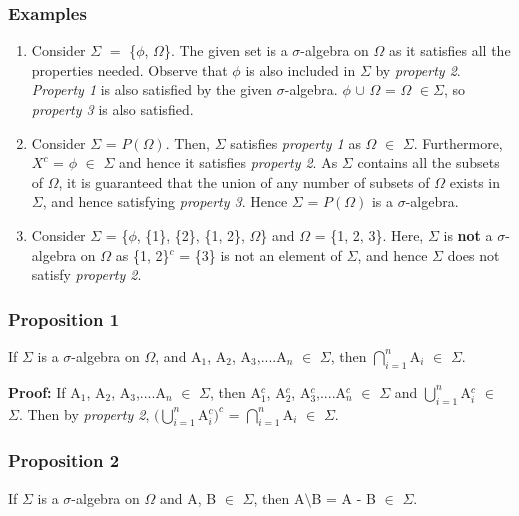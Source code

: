 \documentclass{article}
\begin{document}
\subsubsection{Examples}
\begin{enumerate}
	\item Consider $\Sigma$ $=$ \{$\phi$, $\Omega$\}. The given set is a $\sigma$-algebra on $\Omega$ as it satisfies all the properties needed. Observe that $\phi$ is also included in $\Sigma$ by \textit{property 2}. \textit{Property 1} is also satisfied by the given $\sigma$-algebra. $\phi $ $\cup$ $\Omega$ = $\Omega$ $\in \Sigma$, so \textit{property 3} is also satisfied.
	\item Consider $\Sigma$ = $P(\Omega)$. Then, $\Sigma$ satisfies \textit{property 1} as $\Omega$ $\in$ $\Sigma$. Furthermore, $X^c$ = $\phi$ $\in$ $\Sigma$ and hence it satisfies \textit{property 2}. As $\Sigma$ contains all the subsets of $\Omega$, it is guaranteed that the union of any number of subsets of $\Omega$ exists in $\Sigma$, and hence satisfying \textit{property 3}. Hence $\Sigma$ = $P(\Omega)$ is a $\sigma$-algebra. 
	\item Consider $\Sigma$ = \{$\phi$, \{1\}, \{2\}, \{1, 2\}, $\Omega$\} and $\Omega$ = \{1, 2, 3\}. Here, $\Sigma$ is \textbf{not} a $\sigma$-algebra on $\Omega$ as \{1, 2\}$^c$ = \{3\} is not an element of $\Sigma$, and hence $\Sigma$ does not satisfy \textit{property 2}.
\end{enumerate}


\subsubsection{Proposition 1}
If $\Sigma$ is a $\sigma$-algebra on $\Omega$, and A$_1$, A$_2$, A$_3$,....A$_n$ $\in$ $\Sigma$, then $\bigcap\limits_{i=1}^n$A$_i$ $\in$ $\Sigma$.

\textbf{Proof: }If A$_1$, A$_2$, A$_3$,....A$_n$ $\in$ $\Sigma$, then A$_1^c$, A$_2^c$, A$_3^c$,....A$_n^c$ $\in$ $\Sigma$ and $\bigcup\limits_{i=1}^n$A$_i^c$ $\in$ $\Sigma$. Then by \textit{property 2}, $(\bigcup\limits_{i=1}^n$A$_i^c)^c$ = $\bigcap\limits_{i=1}^n$A$_i$ $\in$ $\Sigma$.


\subsubsection{Proposition 2}
If $\Sigma$ is a $\sigma$-algebra on $\Omega$ and A, B $\in$ $\Sigma$, then A$\setminus$B = A - B $\in$ $\Sigma$.\medskip
\end{document}
